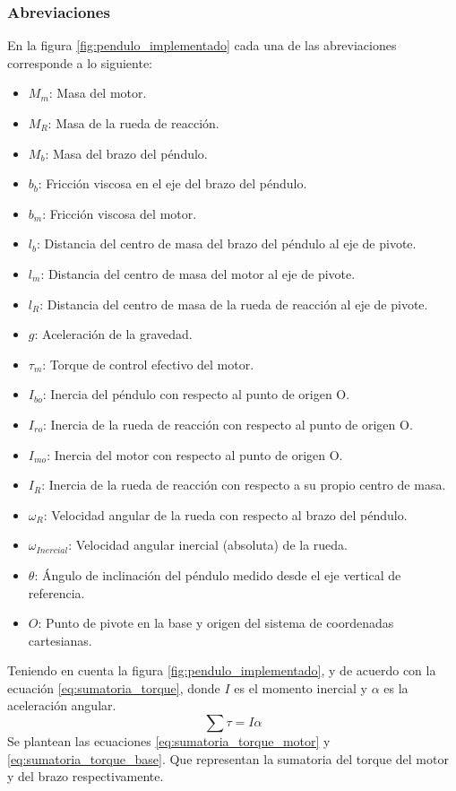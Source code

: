 \documentclass[conference]{IEEEtran}
\begin{document}
\subsubsection{Abreviaciones}
En la figura \ref{fig:pendulo_implementado} cada una de las abreviaciones corresponde a lo siguiente:
\begin{itemize}
    \item \textbf{$M_m$}: Masa del motor.
    \item \textbf{$M_R$}: Masa de la rueda de reacción.
    \item \textbf{$M_b$}: Masa del brazo del péndulo.
    \item \textbf{$b_b$}: Fricción viscosa en el eje del brazo del péndulo.
    \item \textbf{$b_m$}: Fricción viscosa del motor.
    \item \textbf{$l_b$}: Distancia del centro de masa del brazo del péndulo al eje de pivote.
    \item \textbf{$l_m$}: Distancia del centro de masa del motor al eje de pivote.
    \item \textbf{$l_R$}: Distancia del centro de masa de la rueda de reacción al eje de pivote.
    \item \textbf{$g$}: Aceleración de la gravedad.
    \item \textbf{$\tau_m$}: Torque de control efectivo del motor.
    \item \textbf{$I_{bo}$}: Inercia del péndulo con respecto al punto de origen O.
    \item \textbf{$I_{ro}$}: Inercia de la rueda de reacción con respecto al punto de origen O.
    \item \textbf{$I_{mo}$}: Inercia del motor con respecto al punto de origen O.
    \item \textbf{$I_R$}: Inercia de la rueda de reacción con respecto a su propio centro de masa.
    \item \textbf{$\omega_R$}: Velocidad angular de la rueda con respecto al brazo del péndulo.
    \item \textbf{$\omega_{Inercial}$}: Velocidad angular inercial (absoluta) de la rueda.
    \item \textbf{$\theta$}: Ángulo de inclinación del péndulo medido desde el eje vertical de referencia.
    \item \textbf{$O$}: Punto de pivote en la base y origen del sistema de coordenadas cartesianas.
\end{itemize}
Teniendo en cuenta la figura \ref{fig:pendulo_implementado}, y de acuerdo con la ecuación \eqref{eq:sumatoria_torque}, donde $I$ es el momento inercial y $\alpha$ es la aceleración angular.
\begin{equation}
    \sum \tau = I \alpha
    \label{eq:sumatoria_torque}
\end{equation}
Se plantean las ecuaciones \eqref{eq:sumatoria_torque_motor} y \eqref{eq:sumatoria_torque_base}. Que representan la sumatoria del torque del motor y del brazo respectivamente.
\end{document}
